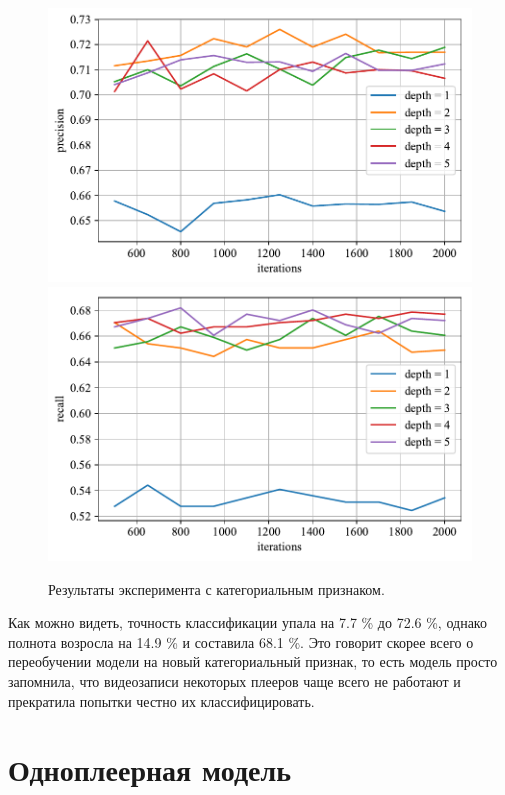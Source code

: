 \begin{figure}
    \centering
    \includegraphics{../images/toloka_catboost_with_cat_precision.pdf}
    \includegraphics{../images/toloka_catboost_with_cat_recall.pdf}
    \caption{Результаты эксперимента с категориальным признаком.}
    \label{fig:toloka_catboost_with_cat}
\end{figure}

Как можно видеть, точность классификации упала на 7.7 \% до 72.6 \%, однако полнота возросла на 14.9 \% и составила 68.1 \%. Это говорит скорее всего о переобучении модели на новый категориальный признак, то есть модель просто запомнила, что видеозаписи некоторых плееров чаще всего не работают и прекратила попытки честно их классифицировать.

\section{Одноплеерная модель}

